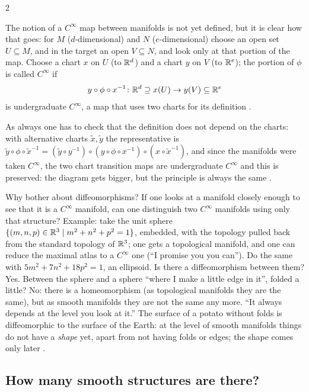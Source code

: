 \begin{paracol}{2}
\begin{definition}
The notion of a $C^\infty$ map between manifolds is not yet defined, but it is clear how that goes: for $M$ ($d$-dimensional) and $N$ ($e$-dimensional) choose an open set $U\subseteq M$, and in the target an open $V\subseteq N$, and look only at that portion of the map. Choose a chart $x$ on $U$ (to $\mathbb{R}^d$) and a chart $y$ on $V$ (to $\mathbb{R}^e$);
the portion of $\phi$ is called $C^\infty$ if
\[
  y\circ\phi\circ x^{-1}\colon\mathbb{R}^d\supseteq x(U)\to y(V)\subseteq\mathbb{R}^e
\]
is undergraduate $C^\infty$, a map that uses two charts for its definition .
\end{definition}
As always one has to check that the definition does not depend on the charts: with alternative charts $\tilde x,\tilde y$ the representative is $\tilde y\circ\phi\circ\tilde x^{-1}=(\tilde y\circ y^{-1})\circ(y\circ\phi\circ x^{-1})\circ(x\circ\tilde x^{-1})$, and since the manifolds were taken $C^\infty$,
the two chart transition maps are undergraduate $C^\infty$ and this is preserved: the diagram gets bigger, but the principle is always the same .

Why bother about diffeomorphisms? If one looks at a manifold closely enough to see that it is a $C^\infty$ manifold, can one distinguish two $C^\infty$ manifolds using only that structure? Example: take the unit sphere $\{(m,n,p)\in\mathbb{R}^3\mid m^2+n^2+p^2=1\}$, embedded, with the topology pulled back from the standard topology of $\mathbb{R}^3$; one gets a topological manifold,
and one can reduce the maximal atlas to a $C^\infty$ one (``I promise you you can''). Do the same with $5m^2+7n^2+18p^2=1$, an ellipsoid. Is there a diffeomorphism between them? Yes. Between the sphere and a sphere ``where I make a little edge in it'', folded a little? No: there is a homeomorphism (as topological manifolds they are the same),
but as smooth manifolds they are not the same any more. ``It always depends at the level you look at it.'' The surface of a potato without folds is diffeomorphic to the surface of the Earth: at the level of smooth manifolds things do not have a \emph{shape} yet, apart from not having folds or edges; the shape comes only later
.

\subsection{How many smooth structures are there?}


\end{paracol}
